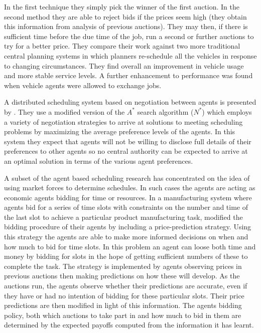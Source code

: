 In the first technique they simply pick the winner of the first auction. In the second method they are able to reject bids if the prices seem high (they obtain this information from analysis of previous auctions). They may then, if there is sufficient time before the due time of the job, run a second or further auctions to try for a better price. 
They compare their work against two more traditional central planning systems in which planners re-schedule all the vehicles in response to changing circumstances. They find overall an improvement in vehicle usage and more stable service levels. A further enhancement to performance was found when vehicle agents were allowed to exchange jobs.

A distributed scheduling system based on negotiation between agents is presented by \citet{chun03nstar}. They use a modified version of the $A^*$ search algorithm ($N^*$) which employs a variety of negotiation strategies to arrive at solutions to meeting scheduling problems by maximizing the average preference levels of the agents. In this system they expect that agents will not be willing to disclose full details of their preferences to other agents so no central authority can be expected to arrive at an optimal solution in terms of the various agent preferences.

A subset of the agent based scheduling research has concentrated on the idea of using market forces to determine schedules. In such cases the agents are acting as economic agents bidding for time or resources. In a manufacturing system where agents bid for a series of time slots with constraints on the number and time of the last slot to achieve a particular product manufacturing task, \citet{mackie04price} modified the bidding procedure of their agents by including a price-prediction strategy. Using this strategy the agents are able to make more informed decisions on when and how much to bid for time slots. In this problem an agent can loose both time and money by bidding for slots in the hope of getting sufficient numbers of these to complete the task. The strategy is implemented by agents observing prices in previous auctions then making predictions on how these will develop. As the auctions run, the agents observe whether their predictions are accurate, even if they have or had no intention of bidding for these particular slots. Their price predictions are then modified in light of this information. The agents bidding policy, both which auctions to take part in and how much to bid in them are determined by the expected payoffs computed from the information it has learnt. 

